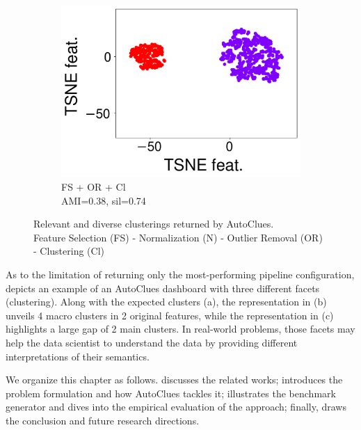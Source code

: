 \begin{figure}[t]
    ~
    \begin{subfigure}[t]{0.31\columnwidth}
        \centering
        \includegraphics[scale=.15]{chapters/data-centric/unsupervised/img/dashboard_2_pred.pdf}  
        \caption{FS + OR + Cl\\ \scriptsize{AMI=0.38, sil=0.74}}
        \label{clustering-fig:d2}
    \end{subfigure}
    \caption{Relevant and diverse clusterings returned by AutoClues.\\
    \small{Feature Selection (FS) - Normalization (N) - Outlier Removal (OR) - Clustering (Cl)}}
    \label{clustering-fig:dashboard}
\end{figure}

As to the limitation of returning only the most-performing pipeline configuration,  depicts an example of an AutoClues dashboard with three different facets (clustering).
Along with the expected clusters (a), the representation in (b) unveils 4 macro clusters in 2 original features, while the representation in (c) highlights a large gap of 2 main clusters.
In real-world problems, those facets may help the data scientist to understand the data by providing different interpretations of their semantics.

We organize this chapter as follows.
 discusses the related works;  introduces the problem formulation and how AutoClues tackles it;  illustrates the benchmark generator and dives into the empirical evaluation of the approach; finally,  draws the conclusion and future research directions.


